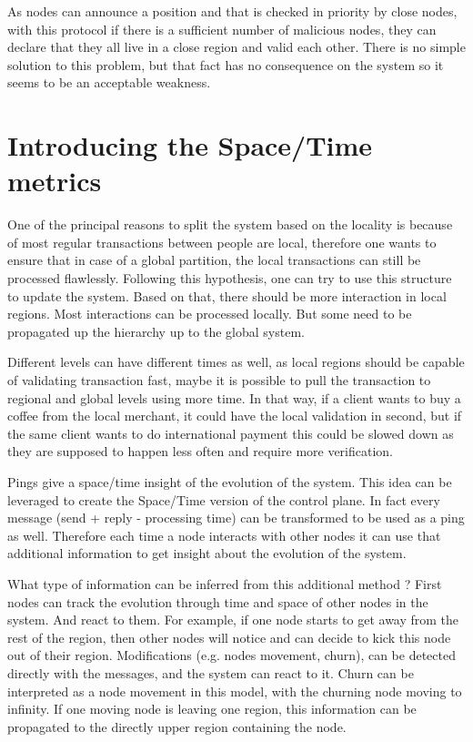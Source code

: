 \documentclass[a4paper,11pt,oneside]{report}
\begin{document}
As nodes can announce a position and that is checked in priority by close
nodes, with this protocol if there is a sufficient number of malicious nodes,
they can declare that they all live in a close region and valid each other.
There is no simple solution to this problem, but that fact has no consequence
on the system so it seems to be an acceptable weakness.

\section{Introducing the Space/Time metrics}
One of the principal reasons to split the system based on the locality is
because of most regular transactions between people are local, therefore one
wants to ensure that in case of a global partition, the local transactions can
still be processed flawlessly. Following this hypothesis, one can try to use
this structure to update the system. Based on that, there should be more
interaction in local regions. Most interactions can be processed locally. But
some need to be propagated up the hierarchy up to the global system. 

Different levels can have different times as well, as local regions should be
capable of validating transaction fast, maybe it is possible to pull the
transaction to regional and global levels using more time. In that way, if a
client wants to buy a coffee from the local merchant, it could have the local
validation in second, but if the same client wants to do international payment
this could be slowed down as they are supposed to happen less often and require
more verification.

Pings give a space/time insight of the evolution of the system.  This idea can
be leveraged to create the Space/Time version of the control plane. In fact
every message (send + reply - processing time) can be transformed to be used as
a ping as well. Therefore each time a node interacts with other nodes it can
use that additional information to get insight about the evolution of the
system. 

What type of information can be inferred from this additional method ? First
nodes can track the evolution through time and space of other nodes in the
system. And react to them. For example, if one node starts to get away
from the rest of the region, then other nodes will notice and can decide to
kick this node out of their region.
Modifications (e.g. nodes movement, churn), can be detected directly with the
messages, and the system can react to it. Churn can be interpreted as a node
movement in this model, with the churning node moving to infinity. If one
moving node is leaving one region, this information can be propagated to the
directly upper region containing the node. 
\end{document}
